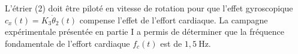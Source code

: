 %
%
%
%
%
%
%
%
%
%
%


L'étrier (2) doit être piloté en vitesse de rotation pour que l'effet gyroscopique $c_{x}(t)=K_{3} \dot{\theta}_{2}(t)$ compense l'effet de l'effort cardiaque. La campagne expérimentale présentée en partie I a permis de déterminer que la fréquence fondamentale de l'effort cardiaque $f_{c}(t)$ est de $1,5 \mathrm{~Hz}$.


